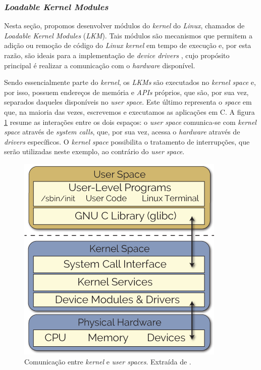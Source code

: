 \subsubsection{\textit{Loadable Kernel Modules}}

Nesta seção, propomos desenvolver módulos do
\textit{kernel} do \textit{Linux}, chamados de \textit{Loadable Kernel Modules} (\textit{LKM}).
Tais módulos são mecanismos que permitem a adição ou remoção de código do \textit{Linux kernel}
em tempo de execução e, por esta razão, são ideais para a implementação de
\textit{device drivers} \cite{derek}, cujo propósito principal é realizar a
comunicação com o \textit{hardware} disponível.  

\vspace{12pt}

Sendo essencialmente parte do \textit{kernel}, os \textit{LKMs} são executados
no \textit{kernel space} e, por isso, possuem endereços de memória e
\textit{APIs} próprios, que são, por sua vez, separados daqueles
disponíveis no \textit{user space}. Este último representa o \textit{space} em
que, na maioria das vezes, escrevemos e executamos as aplicações em C. A figura
\ref{fig:derek_kernel_user} resume as interações entre os dois espaços: o
\textit{user space} comunica-se com \textit{kernel space} através de
\textit{system calls}, que, por sua vez, acessa o \textit{hardware} através de
\textit{drivers} específicos. O \textit{kernel space} possibilita o tratamento
de interrupções, que serão utilizadas neste exemplo, ao contrário do
\textit{user space}.

\begin{figure}[h]

\centering
\includegraphics[scale=0.45]{image/userspace-kernelspace}
\caption {Comunicação entre \textit{kernel} e \textit{user spaces}. Extraída de
\cite{derek}.}
\label{fig:derek_kernel_user}
\end{figure}

